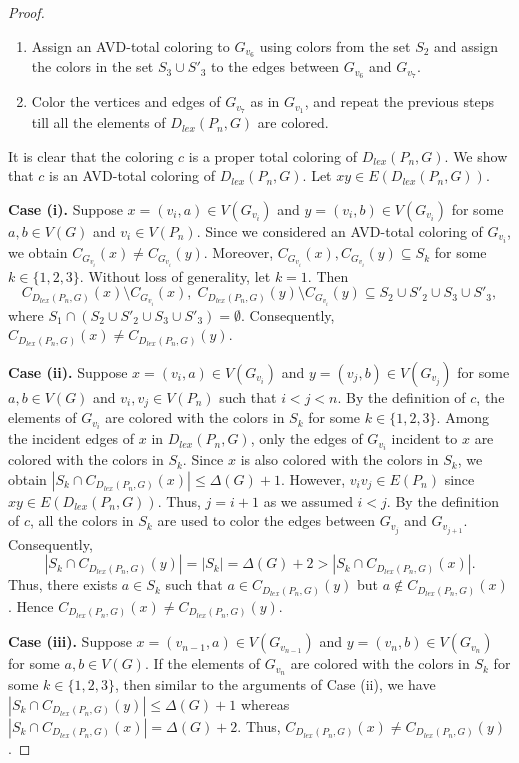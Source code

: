 \documentclass[10pt,a4paper]{amsart}
\begin{document}
\begin{proof}
\begin{enumerate}
    \item Assign an AVD-total coloring to $G_{v_6}$ using colors from the set $S_2$ and assign the colors in the set $S_3\cup S'_3$ to the edges between $G_{v_6}$ and $G_{v_7}$.

    \item Color the vertices and edges of $G_{v_{7}}$ as in $G_{v_{1}}$, and repeat the previous steps till all the elements of $D_{lex}(P_n, G)$ are colored.
\end{enumerate}

It is clear that the coloring $c$ is a proper total coloring of $D_{lex}(P_n,G)$. 
We show that $c$ is an AVD-total coloring of $D_{lex}(P_n,G)$. 
Let $xy\in E(D_{lex}(P_n,G))$. 

\textbf{Case (i).} Suppose $x=(v_i,a)\in V(G_{v_i})$ and $y=(v_i,b)\in V(G_{v_i})$ for some $a,b\in V(G)$ and $v_{i} \in V(P_n)$.
Since we considered an AVD-total coloring of $G_{v_i}$, we obtain $C_{G_{v_i}}(x)\neq C_{G_{v_i}}(y)$.  Moreover, $C_{G_{v_i}}(x), C_{G_{v_i}}(y)\subseteq S_k$ for some $k\in \{1,2,3\}$.
Without loss of generality, let $k=1$. Then
\[
C_{D_{lex}(P_n, G)}(x)\setminus C_{G_{v_i}}(x),\;
C_{D_{lex}(P_n, G)}(y)\setminus C_{G_{v_i}}(y)
\subseteq S_2\cup S'_2\cup S_3 \cup S'_3,
\]
where $S_1 \cap (S_2\cup S'_2\cup S_3 \cup S'_3)=\emptyset$.
Consequently, $C_{D_{lex}(P_n, G)}(x)\neq C_{D_{lex}(P_n, G)}(y)$.
 
\textbf{Case (ii).} Suppose $x=(v_i,a)\in V(G_{v_i})$ and $y=(v_j,b)\in V(G_{v_j})$ for some $a,b\in V(G)$ and $v_i,v_j\in V(P_n)$ such that $i< j<n$. By the definition of $c$, the elements of $G_{v_i}$ are colored with the colors in $S_k$ for some $k\in\{1,2,3\}$.
Among the incident edges of $x$ in $D_{lex}(P_n, G)$, only the edges of $G_{v_i}$ incident to $x$ are colored with the colors in $S_k$. Since $x$ is also colored with the colors in $S_k$, we obtain $|S_k\cap C_{D_{lex}(P_n, G)}(x)|\leq \Delta(G)+1$.
However, $v_iv_j\in E(P_n)$ since $xy\in E(D_{lex}(P_n,G))$. Thus, $j=i+1$ as we assumed $i<j$. 
By the definition of $c$, all the colors in $S_k$ are used to color the edges between $G_{v_j}$ and $G_{v_{j+1}}$.
Consequently, 
\[|S_k\cap C_{D_{lex}(P_n, G)}(y)|= |S_k| = \Delta(G)+2>|S_k\cap C_{D_{lex}(P_n, G)}(x)|.\] 
Thus, there exists $a\in S_k$ such that $a\in C_{D_{lex}(P_n, G)}(y)$ but  $a\not\in C_{D_{lex}(P_n, G)}(x)$. Hence $C_{D_{lex}(P_n, G)}(x)\neq C_{D_{lex}(P_n, G)}(y)$.


\textbf{Case (iii).} Suppose $x=(v_{n-1},a)\in V(G_{v_{n-1}})$ and $y=(v_n,b)\in V(G_{v_n})$ for some $a,b\in V(G)$. If the elements of $G_{v_n}$ are colored with the colors in $S_k$ for some $k\in\{1,2,3\}$, then similar to the arguments of Case (ii), we have $|S_k\cap C_{D_{lex}(P_n, G)}(y)|\leq \Delta(G)+1$ whereas $|S_k\cap C_{D_{lex}(P_n, G)}(x)|= \Delta(G)+2$. Thus, $C_{D_{lex}(P_n, G)}(x)\neq C_{D_{lex}(P_n, G)}(y)$.
\end{proof}
\end{document}

